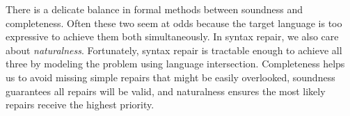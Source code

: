 \documentclass[sigplan,review,acmsmall,nonacm,screen,anonymous]{acmart}\settopmatter{printfolios=false,printccs=false,printacmref=false}
\begin{document}

There is a delicate balance in formal methods between soundness and completeness. Often these two seem at odds because the target language is too expressive to achieve them both simultaneously. In syntax repair, we also care about \textit{naturalness}. Fortunately, syntax repair is tractable enough to achieve all three by modeling the problem using language intersection. Completeness helps us to avoid missing simple repairs that might be easily overlooked, soundness guarantees all repairs will be valid, and naturalness ensures the most likely repairs receive the highest priority.



\end{document}
